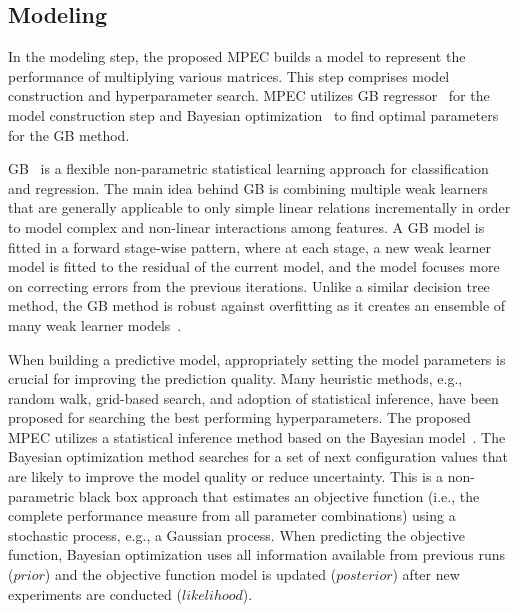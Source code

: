 \documentclass[10pt, conference, compsocconf]{IEEEtran}
\begin{document}
\subsection{Modeling}\label{sec:modeling}
In the modeling step, the proposed MPEC builds a model to represent the performance of multiplying various matrices. This step comprises  model construction and hyperparameter search. MPEC utilizes GB regressor~\cite{gradient-boosting} for the model construction step and Bayesian optimization~\cite{bayesian-optimization} to find optimal parameters for the GB method.

GB~\cite{gradient-boosting} is a flexible non-parametric statistical learning approach for classification and regression. The main idea behind GB is combining multiple weak learners that are generally applicable to only simple linear relations incrementally in order to model complex and non-linear interactions among features. A GB model is fitted in a forward stage-wise pattern, where at each stage, a new weak learner model is fitted to the residual of the current model, and the model focuses more on correcting errors from the previous iterations. Unlike a similar decision tree method, the GB method is robust against overfitting as it creates an ensemble of many weak learner models~\cite{random-forest}.

When building a predictive model, appropriately setting the model parameters is crucial for improving the prediction quality. Many heuristic methods, e.g., random walk, grid-based search, and adoption of statistical inference, have been proposed for searching the best performing hyperparameters. The proposed MPEC utilizes a statistical inference method based on the Bayesian model~\cite{bayesian-optimization}. The Bayesian optimization method searches for a set of next configuration values that are likely to improve the model quality or reduce uncertainty. This is a non-parametric black box approach that estimates an objective function (i.e., the complete performance measure from all parameter combinations) using a stochastic process, e.g., a Gaussian process. When predicting the objective function, Bayesian optimization uses all information available from previous runs ($prior$) and the objective function model is updated ($posterior$) after new experiments are conducted ($likelihood$).
\end{document}
